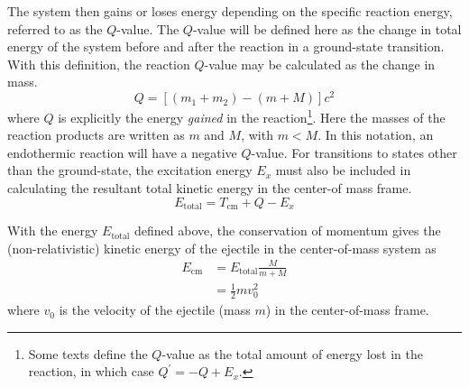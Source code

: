 The system then gains or loses energy depending on the specific reaction energy, referred to as the $Q$-value.  The $Q$-value will be defined here as the change in total energy of the system before and after the reaction in a ground-state transition.  With this definition, the reaction $Q$-value may be calculated as the change in mass.
\begin{equation}
Q=[(m_1+m_2)-(m+M)]c^2
\label{eq:q_value}
\end{equation}
where $Q$ is explicitly the energy \textit{gained} in the reaction\footnote{Some texts define the $Q$-value as the total amount of energy lost in the reaction, in which case $Q^\prime=-Q+E_x$.}.  Here the masses of the reaction products are written as $m$ and $M$, with $m<M$.  In this notation, an endothermic reaction will have a negative $Q$-value.  For transitions to states other than the ground-state, the excitation energy $E_x$ must also be included in calculating %
the resultant total kinetic energy in the center-of mass frame.
\begin{equation}
E_\mathrm{total}=T_\mathrm{cm}+Q-E_x
\label{eq:ecmtotal}
\end{equation}

With the energy $E_\textrm{total}$ defined above, the conservation of momentum gives the (non-relativistic) kinetic energy of the ejectile in the center-of-mass system as
\begin{equation}
\begin{split}
E_\mathrm{cm}&=E_\mathrm{total}\frac{M}{m+M}\\
&=\frac{1}{2}m v_0^2
\end{split}
\label{eq:ecm}
\end{equation}
where $v_0$ is the velocity of the ejectile (mass $m$) in the center-of-mass frame.

